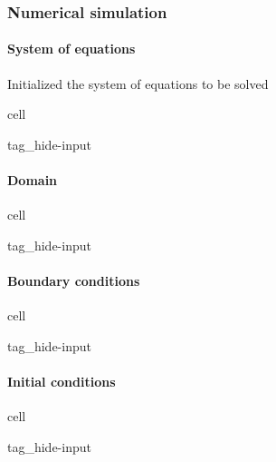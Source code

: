 \documentclass[letterpaper,10pt,english]{jupyterBook}
\begin{document}
\subsubsection{Numerical simulation}
\label{\detokenize{ch/pde/euler-1d:numerical-simulation}}

\paragraph{System of equations}
\label{\detokenize{ch/pde/euler-1d:system-of-equations}}
\sphinxAtStartPar
Initialized the system of equations to be solved

\begin{sphinxuseclass}{cell}
\begin{sphinxuseclass}{tag_hide-input}
\end{sphinxuseclass}
\end{sphinxuseclass}

\paragraph{Domain}
\label{\detokenize{ch/pde/euler-1d:domain}}
\begin{sphinxuseclass}{cell}
\begin{sphinxuseclass}{tag_hide-input}
\end{sphinxuseclass}
\end{sphinxuseclass}

\paragraph{Boundary conditions}
\label{\detokenize{ch/pde/euler-1d:boundary-conditions}}
\begin{sphinxuseclass}{cell}
\begin{sphinxuseclass}{tag_hide-input}
\end{sphinxuseclass}
\end{sphinxuseclass}

\paragraph{Initial conditions}
\label{\detokenize{ch/pde/euler-1d:initial-conditions}}
\begin{sphinxuseclass}{cell}
\begin{sphinxuseclass}{tag_hide-input}
\end{sphinxuseclass}
\end{sphinxuseclass}
\end{document}
